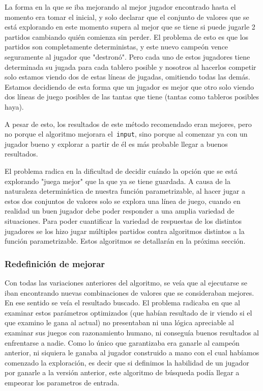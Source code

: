 \documentclass[A4paper,oneside,fleqn,11pt]{article}
\theoremstyle{definition}
\begin{document}
La forma en la que se iba mejorando al mejor jugador encontrado hasta el momento era tomar el inicial, y solo declarar que el conjunto de valores que se está explorando en este momento supera al mejor que se tiene si puede jugarle 2 partidos cambiando quién comienza sin perder. El problema de esto es que los partidos son completamente deterministas, y este nuevo campeón vence seguramente al jugador que "destronó". Pero cada uno de estos jugadores tiene determinada su jugada para cada tablero posible y nosotros al hacerlos competir solo estamos viendo dos de estas líneas de jugadas, omitiendo todas las demás. Estamos decidiendo de esta forma que un jugador es mejor que otro solo viendo dos líneas de juego posibles de las tantas que tiene (tantas como tableros posibles haya).

A pesar de esto, los resultados de este método recomendado eran mejores, pero no porque el algoritmo mejorara el\texttt{ input}, sino porque al comenzar ya con un jugador bueno y explorar a partir de él es más probable llegar a buenos resultados. 

El problema radica en la dificultad de decidir cuándo la opción que se está explorando "juega mejor" que la que ya se tiene guardada. A causa de la naturaleza determinística de nuestra función parametrizable, al hacer jugar a estos dos conjuntos de valores solo se explora una línea de juego, cuando en realidad un buen jugador debe poder responder a una amplia variedad de situaciones. Para poder cuantificar la variedad de respuestas de los distintos jugadores se los hizo jugar múltiples partidos contra algoritmos distintos a la función parametrizable. Estos algoritmos se detallarán en la próxima sección.

\subsubsection {Redefinición de mejorar}

Con todas las variaciones anteriores del algoritmo, se veía que al ejecutarse se iban encontrando nuevas combinaciones de valores que se consideraban mejores. En ese sentido se veía el resultado buscado. El problema radicaba en que al examinar estos parámetros optimizados (que habían resultado de ir viendo si el que examino le gana al actual) no presentaban ni una lógica apreciable al examinar sus juegos con razonamiento humano, ni conseguía buenos resultados al enfrentarse a nadie. Como lo único que garantizaba era ganarle al campeón anterior, ni siquiera le ganaba al jugador construido a mano con el cual habíamos comenzado la exploración, es decir que si definimos la habilidad de un jugador por ganarle a la versión anterior, este algoritmo de búsqueda podía llegar a empeorar los parametros de entrada.
\end{document}
